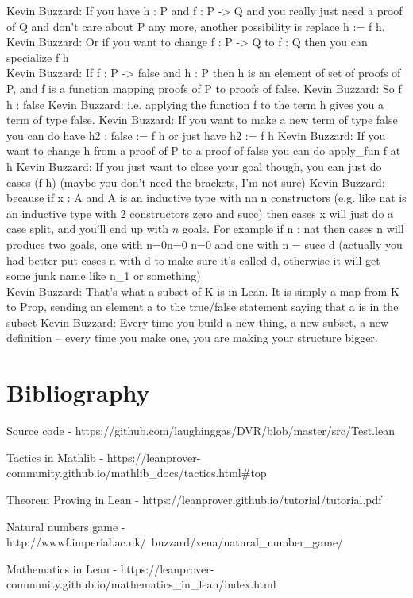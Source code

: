 \documentclass[10pt, a4paper]{article}
\begin{document}
Kevin Buzzard: If you have h : P and f : P -> Q and you really just need a proof of Q and don't care about P any more, another possibility is replace h := f h.
Kevin Buzzard: Or if you want to change f : P -> Q to f : Q then you can specialize f h \\

Kevin Buzzard: If f : P -> false and h : P then h is an element of set of proofs of P, and f is a function mapping proofs of P to proofs of false.
Kevin Buzzard: So f h : false
Kevin Buzzard: i.e. applying the function f to the term h gives you a term of type false.
Kevin Buzzard: If you want to make a new term of type false you can do have h2 : false := f h or just have h2 := f h
Kevin Buzzard: If you want to change h from a proof of P to a proof of false you can do apply_fun f at h
Kevin Buzzard: If you just want to close your goal though, you can just do cases (f h) (maybe you don't need the brackets, I'm not sure)
Kevin Buzzard: because if x : A and A is an inductive type with 
nn
n constructors (e.g. like nat is an inductive type with 2 constructors zero and succ) then cases x will just do a case split, and you'll end up with $n$ goals. For example if n : nat then cases n will produce two goals, one with 
n=0n=0
n=0 and one with n = succ d (actually you had better put cases n with d to make sure it's called d, otherwise it will get some junk name like n_1 or something) \\

Kevin Buzzard: That's what a subset of K is in Lean. It is simply a map from K to Prop, sending an element a to the true/false statement saying that a is in the subset
Kevin Buzzard: Every time you build a new thing, a new subset, a new definition -- every time you make one, you are making your structure bigger. \\

\section{Bibliography}
\item Source code - 
https://github.com/laughinggas/DVR/blob/master/src/Test.lean

\item Tactics in Mathlib - 
https://leanprover-community.github.io/mathlib_docs/tactics.html#top
 
 \item Theorem Proving in Lean - https://leanprover.github.io/tutorial/tutorial.pdf
 
 \item Natural numbers game - http://wwwf.imperial.ac.uk/~buzzard/xena/natural_number_game/
 
 \item Mathematics in Lean - 
 https://leanprover-community.github.io/mathematics_in_lean/index.html
\end{document}
